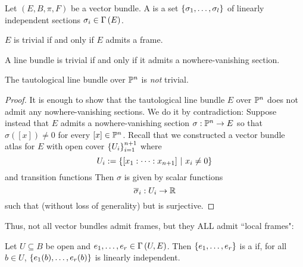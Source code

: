 \documentclass[main.tex]{subfiles}
\begin{document}
Let $(E, B, \pi, F)$ be a vector bundle. A  is a set $\left\{\sigma_1, \dots, \sigma_l\right\}$ of linearly independent sections $\sigma_i \in \Gamma\left( E \right)$.

\begin{prop}
$E$ is trivial if and only if $E$ admits a frame.
\end{prop}

\begin{cor}
A line bundle is trivial if and only  if it admits a nowhere-vanishing section.
\end{cor}

\begin{prop}
The tautological line bundle over $\mathbb{P}^n$ is \textit{not} trivial.
\end{prop}

\begin{proof}
    It is enough to show that the tautological line bundle $E$ over $\mathbb{P}^n$ does not admit any nowhere-vanishing sections. We do it by contradiction: Suppose instead that $E$ admits a nowhere-vanishing section $\sigma: \mathbb{P}^n \to E$ so that $\sigma([x]) \neq 0$ for every $[x] \in \mathbb{P}^n$. Recall that we constructed a vector bundle atlas for $E$ with open cover $\left\{U_i\right\}_{i=1}^{n+1}$ where
    \[
    U_i := \left\{ [x_1 : \dots : x_{n+1}] \ | \  x_i \neq 0 \right\}
    \]
    and transition functions
    Then $\sigma$ is given by scalar functions
    \[
    \overline{\sigma}_i : U_i \to \mathbb{R}
    \]
    such that (without loss of generality)
    but
     is surjective.
\end{proof}

Thus, not all vector bundles admit frames, but they ALL admit ``local frames":

\begin{defn}
 Let $U \subseteq B$ be open and $e_1, \dots, e_r \in \Gamma\left( U, E \right)$. Then $\left\{e_1, \dots, e_r\right\}$ is a  if, for all $b \in U$, $\left\{ e_1(b), \dots, e_r(b)\right\}$ is linearly independent.
\end{defn}
\end{document}
